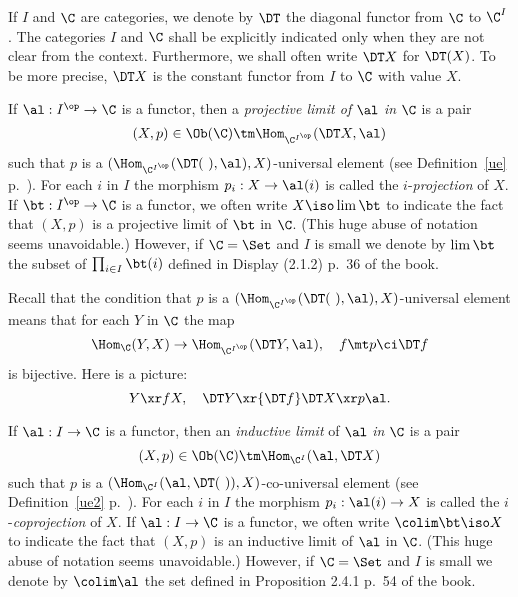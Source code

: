 \documentclass[12pt]{article}
\theoremstyle{remark}
\theoremstyle{definition}
\begin{document}
\begin{nota}
If $I$ and $\C$ are categories, we denote by $\DT$ the diagonal functor from $\C$ to $\C^I$. The categories $I$ and $\C$ shall be explicitly indicated only when they are not clear from the context. Furthermore, we shall often write $\DT X$ for $\DT(X)$. To be more precise, $\DT X$ is the constant functor from $I$ to $\C$ with value $X$.
\end{nota}

\begin{df}
If $\al:I^{\op}\to\C$ is a functor, %
then a {\em projective limit of} $\al$ {\em in} $\C$ is a pair 
$$
(X,p)\in\Ob(\C)\tm\Hom_{\C^{I^{\op}}}(\DT X,\al)
$$
such that $p$ is a $(\Hom_{\C^{I^{\op}}}(\DT(\ ),\al),X)$\--universal element (see Definition~\ref{ue} p.~). For each $i$ in $I$ the morphism $p_i:X\to\al(i)$ is called the $i$-{\em projection} of $X$. %
If $\bt:I^{\op}\to\C$ is a functor, we often write $X\iso\lim\bt$ to indicate the fact that $(X,p)$ is a projective limit of $\bt$ in $\C$. (This huge abuse of notation seems unavoidable.) However, if $\C=\Set$ and $I$ is small we denote by $\lim\bt$ the subset of $\prod_{i\in I}\bt(i)$ defined in Display (2.1.2) p.~36 of the book.
\end{df}

Recall that the condition that $p$ is a $(\Hom_{\C^{I^{\op}}}(\DT(\ ),\al),X)$\--universal element means that for each $Y$ in $\C$ the map 
$$
\Hom_\C(Y,X)\to\Hom_{\C^{I^{\op}}}(\DT Y,\al),\quad f\mt p\ci\DT f
$$ 
is bijective. Here is a picture:
$$
Y\xr fX,\quad\DT Y\xr{\DT f}\DT X\xr p\al.
$$

\begin{df}
If $\al:I\to\C$ is a functor, then an {\em inductive limit} of $\al$ {\em in} $\C$ is a pair 
$$
(X,p)\in\Ob(\C)\tm\Hom_{\C^I}(\al,\DT X)
$$
such that $p$ is a $(\Hom_{\C^I}(\al,\DT(\ )),X)$\--co-universal element (see Definition~\ref{ue2} p.~). For each $i$ in $I$ the morphism $p_i:\al(i)\to X$ is called the $i$-{\em coprojection} of $X$. %
If $\al:I\to\C$ is a functor, we often write $\colim\bt\iso X$ to indicate the fact that $(X,p)$ is an inductive limit of $\al$ in $\C$. (This huge abuse of notation seems unavoidable.) However, if $\C=\Set$ and $I$ is small we denote by $\colim\al$ the set defined in Proposition 2.4.1 p.~54 of the book.
\end{df}
\end{document}
